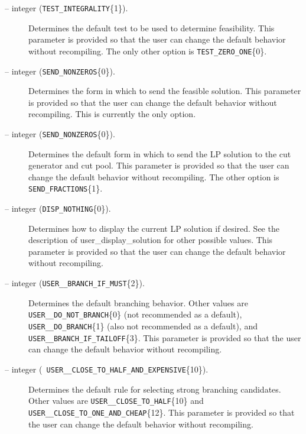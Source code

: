 \begin{description}
\item[ -- integer ({\tt TEST\_INTEGRALITY}\{1\}).]
Determines the default test to be used to determine feasibility. This
parameter is provided so that the user can change the default behavior
without recompiling. The only other option is {\tt TEST\_ZERO\_ONE}\{0\}.

\item[ -- integer 
({\tt SEND\_NONZEROS}\{0\}).] 
Determines the form in which to send the feasible solution. This
parameter is provided so that the user can change the default behavior
without recompiling. This is currently the only option.

\item[ -- integer ({\tt SEND\_NONZEROS}\{0\}).] 
Determines the default form in which to send the LP solution to the
cut generator and cut pool. This
parameter is provided so that the user can change the default behavior
without recompiling. The other option is {\tt SEND\_FRACTIONS}\{1\}.

\item[ -- integer ({\tt DISP\_NOTHING}\{0\}).] 
Determines how to display the current LP solution if desired.
See the description of 
{user_display_solution} for other
possible values. This parameter is provided so that
the user can change the default behavior without recompiling.

\item[ -- integer 
({\tt USER\_\_BRANCH\_IF\_MUST}\{2\}).] 
Determines the default branching behavior. Other values are {\tt
USER\_\_DO\_NOT\_BRANCH}\{0\} (not recommended as a default), {\tt
USER\_\_DO\_BRANCH}\{1\} (also not recommended as a default), and {\tt
USER\_\_BRANCH\_IF\_TAILOFF}\{3\}. This
parameter is provided so that the user can change the default behavior
without recompiling.

\item[ -- integer ({\tt
USER\_\_CLOSE\_TO\_HALF\_AND\_EXPENSIVE}\{10\}).] 
Determines the default rule for selecting strong branching candidates.
Other values are {\tt USER\_\_CLOSE\_TO\_HALF}\{10\} and 
{\tt USER\_\_CLOSE\_TO\_ONE\_AND\_CHEAP}\{12\}. This
parameter is provided so that the user can change the default behavior
without recompiling.


\end{description}
